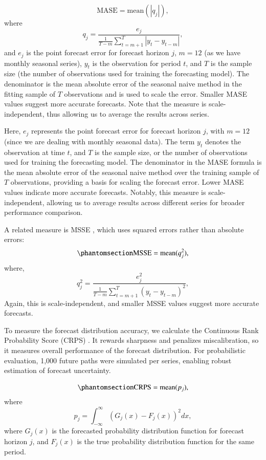 \documentclass[
  authoryear,
  preprint,
  3p]{elsarticle}
\begin{document}
\[
  \text{MASE} = \text{mean}(|q_{j}|),
\] where \[
  q_{j} = \frac{ e_{j}}
 {\displaystyle\frac{1}{T-m}\sum_{t=m+1}^T |y_{t}-y_{t-m}|},
\] and \(e_{j}\) is the point forecast error for forecast horizon \(j\),
\(m = 12\) (as we have monthly seasonal series), \(y_t\) is the
observation for period \(t\), and \(T\) is the sample size (the number
of observations used for training the forecasting model). The
denominator is the mean absolute error of the seasonal naive method in
the fitting sample of \(T\) observations and is used to scale the error.
Smaller MASE values suggest more accurate forecasts. Note that the
measure is scale-independent, thus allowing us to average the results
across series.

Here, \(e_{j}\) represents the point forecast error for forecast horizon
\(j\), with \(m = 12\) (since we are dealing with monthly seasonal
data). The term \(y_t\) denotes the observation at time \(t\), and \(T\)
is the sample size, or the number of observations used for training the
forecasting model. The denominator in the MASE formula is the mean
absolute error of the seasonal naive method over the training sample of
\(T\) observations, providing a basis for scaling the forecast error.
Lower MASE values indicate more accurate forecasts. Notably, this
measure is scale-independent, allowing us to average results across
different series for broader performance comparison.

A related measure is MSSE
\citep{hyndman2021forecasting, makridakis2022m5}, which uses squared
errors rather than absolute errors:
\begin{equation}\phantomsection\label{eq-RMSSE}{
  \text{MSSE} = \text{mean}(q_{j}^2),
}\end{equation} where, \[
  q^2_{j} = \frac{ e^2_{j}}
 {\displaystyle\frac{1}{T-m}\sum_{t=m+1}^T (y_{t}-y_{t-m})^2},
\] Again, this is scale-independent, and smaller MSSE values suggest
more accurate forecasts.

To measure the forecast distribution accuracy, we calculate the
Continuous Rank Probability Score (CRPS) \citep{hyndman2021forecasting}.
It rewards sharpness and penalizes miscalibration, so it measures
overall performance of the forecast distribution. For probabilistic
evaluation, 1,000 future paths were simulated per series, enabling
robust estimation of forecast uncertainty.

\begin{equation}\phantomsection\label{eq-CRPS}{
  \text{CRPS} = \text{mean}(p_j),
}\end{equation} where \[
  p_j = \int_{-\infty}^{\infty} \left(G_j(x) - F_j(x)\right)^2dx,
\] where \(G_j(x)\) is the forecasted probability distribution function
for forecast horizon \(j\), and \(F_j(x)\) is the true probability
distribution function for the same period.
\end{document}
